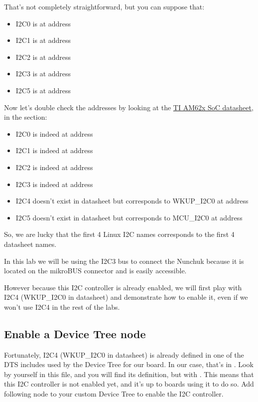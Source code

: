 That's not completely straightforward, but you can suppose that:
\begin{itemize}
\item I2C0 is at address 
\item I2C1 is at address 
\item I2C2 is at address 
\item I2C3 is at address 
\item I2C5 is at address 
\end{itemize}

Now let's double check the addresses by looking at the
\href{https://www.ti.com/lit/ug/spruiv7a/spruiv7a.pdf}{TI AM62x SoC
datasheet}, in the  section:

\begin{itemize}
\item I2C0 is indeed at address 
\item I2C1 is indeed at address 
\item I2C2 is indeed at address 
\item I2C3 is indeed at address 
\item I2C4 doesn't exist in datasheet but corresponds to
      WKUP\_I2C0 at address 
\item I2C5 doesn't exist in datasheet but corresponds to
      MCU\_I2C0 at address 
\end{itemize}

So, we are lucky that the first 4 Linux I2C names corresponds to the first 4
datasheet names.

In this lab we will be using the I2C3 bus to connect the Nunchuk
because it is located on the mikroBUS connector and is easily
accessible.

However because this I2C controller is already enabled, we will
first play with I2C4 (WKUP\_I2C0 in datasheet) and demonstrate
how to enable it, even if we won't use I2C4 in the rest of the labs.

\subsection{Enable a Device Tree node}

Fortunately, I2C4 (WKUP\_I2C0 in datasheet) is already defined
in one of the DTS includes used by the Device Tree for our board.
In our case, that's in .
Look by yourself in this file, and you will find its definition, but with
. This means that this I2C controller is not
enabled yet, and it's up to boards using it to do so. Add following node to your
custom Device Tree to enable the I2C controller.

